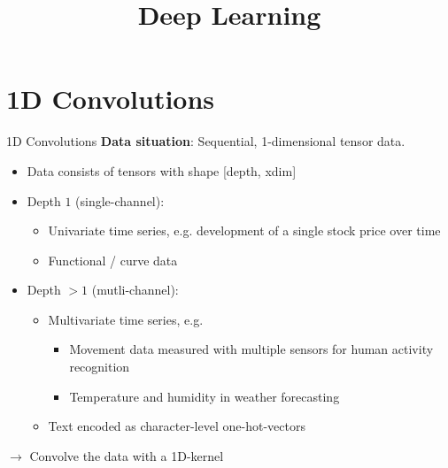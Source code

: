 





\newcommand{\titlefigure}{plots/05_conv_variations/3d/3dconv.png}
\newcommand{\learninggoals}{
  \item 1D Convolutions
  \item 2D Convolutions
  \item 3D Convolutions
}

\title{Deep Learning}
\date{}








\section{1D Convolutions}

\begin{vbframe}{1D Convolutions}
\textbf{Data situation}: Sequential, 1-dimensional tensor data. 

\begin{itemize}
\item Data consists of tensors with shape [depth, xdim]
\item Depth $1$ (single-channel):
    \begin{itemize}
        \item Univariate time series, e.g. development of a single stock price over time
        \item Functional / curve data
    \end{itemize}
\item Depth $> 1$ (mutli-channel):
    \begin{itemize}
        \item Multivariate time series, e.g.
        \begin{itemize}
            \item Movement data measured with multiple sensors for human activity recognition
            \item Temperature and humidity in weather forecasting
        \end{itemize}
        \item Text encoded as character-level one-hot-vectors 
    \end{itemize}
\end{itemize}

$\to$ Convolve the data with a 1D-kernel

\end{vbframe}

